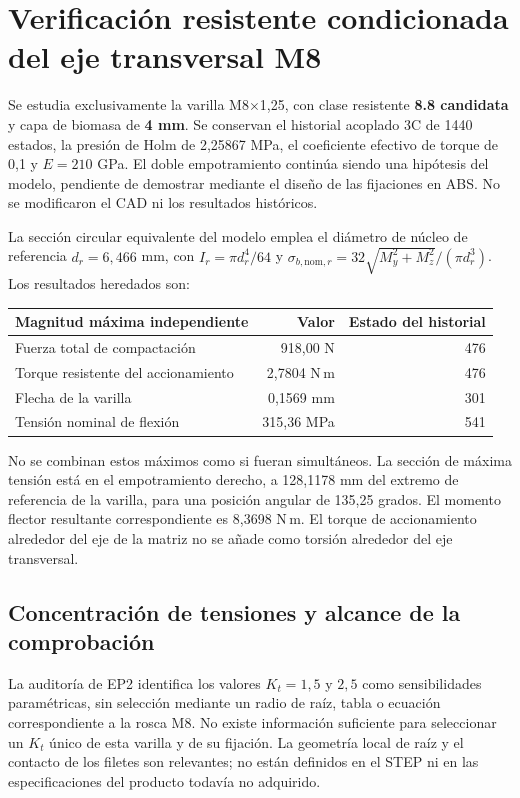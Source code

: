 \section{Verificación resistente condicionada del eje transversal M8}
\label{sec:M8_Kt_revision}
Se estudia exclusivamente la varilla M8$\times$1,25, con clase resistente
\textbf{8.8 candidata} y capa de biomasa de \textbf{4 mm}. Se conservan el
historial acoplado 3C de 1440 estados, la presión de Holm de
2,25867 MPa, el coeficiente efectivo de torque de 0,1 y
$E=210$ GPa. El doble empotramiento continúa siendo una hipótesis del
modelo, pendiente de demostrar mediante el diseño de las fijaciones en ABS.
No se modificaron el CAD ni los resultados históricos.

La sección circular equivalente del modelo emplea el diámetro de núcleo
de referencia $d_r=6,466$ mm, con $I_r=\pi d_r^4/64$ y
$\sigma_{b,\mathrm{nom},r}=32\sqrt{M_y^2+M_z^2}/(\pi d_r^3)$.
Los resultados heredados son:
\begin{center}
\begin{tabular}{lrr}
\toprule
Magnitud máxima independiente & Valor & Estado del historial\\
\midrule
Fuerza total de compactación & 918,00 N & 476\\
Torque resistente del accionamiento & 2,7804 N\,m & 476\\
Flecha de la varilla & 0,1569 mm & 301\\
Tensión nominal de flexión & 315,36 MPa & 541\\
\bottomrule
\end{tabular}
\end{center}
No se combinan estos máximos como si fueran simultáneos. La sección de
máxima tensión está en el empotramiento derecho, a 128,1178 mm del extremo
de referencia de la varilla, para una posición angular de 135,25 grados.
El momento flector resultante correspondiente es 8,3698 N\,m.
El torque de accionamiento alrededor del eje de la matriz no se añade
como torsión alrededor del eje transversal.

\subsection{Concentración de tensiones y alcance de la comprobación}
La auditoría de EP2 identifica los valores $K_t=1,5$ y $2,5$ como
sensibilidades paramétricas, sin selección mediante un radio de raíz,
tabla o ecuación correspondiente a la rosca M8\cite{ep2_auditoria_Kt}.
No existe información suficiente para seleccionar un $K_t$ único de esta
varilla y de su fijación. La geometría local de raíz y el contacto de los
filetes son relevantes\cite{pedersen_2013_roscas}; no están definidos
en el STEP ni en las especificaciones del producto todavía no adquirido.

